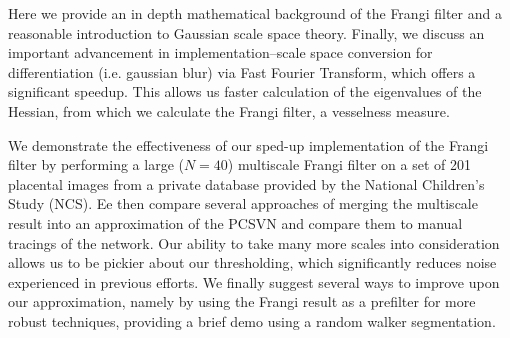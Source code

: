 Here we provide an in depth mathematical background of the Frangi filter and a reasonable introduction to Gaussian scale space theory. Finally, we discuss an important advancement in implementation--scale space conversion for differentiation (i.e. gaussian blur) via Fast Fourier Transform, which offers a significant speedup. This allows us faster calculation of the eigenvalues of the Hessian, from which we calculate the Frangi filter, a vesselness measure.

We demonstrate the effectiveness of our sped-up implementation of the Frangi filter by performing a large ($N=40$) multiscale Frangi filter on a set of 201 placental images from a private database provided by the National Children's Study (NCS). Ee then compare several approaches of merging the multiscale result into an approximation of the PCSVN and compare them to manual tracings of the network. Our ability to take many more scales into consideration allows us to be pickier about our thresholding, which significantly reduces noise experienced in previous efforts. We finally suggest several ways to improve upon our approximation, namely by using the Frangi result as a prefilter for more robust techniques, providing a brief demo using a random walker segmentation.